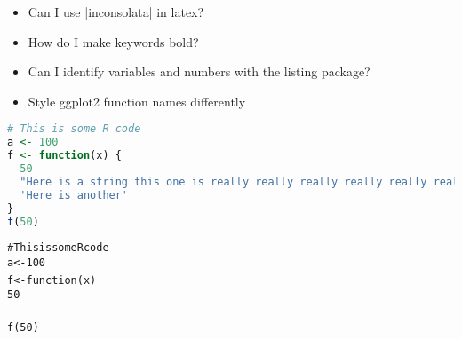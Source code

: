 


\begin{itemize}
  \item Can I use |inconsolata| in latex?
  \item How do I make keywords bold?
  \item Can I identify variables and numbers with the listing package?
  \item Style ggplot2 function names differently
\end{itemize}



\begin{lstlisting}[language=R]
# This is some R code
a <- 100
f <- function(x) {
  50
  "Here is a string this one is really really really really really really really really really really really really long"
  'Here is another'
}
f(50)
\end{lstlisting}

\begin{alltt}
# This is some R code
a <- 100
f <- function(x) {
  50
}
f(50)
\end{alltt}

